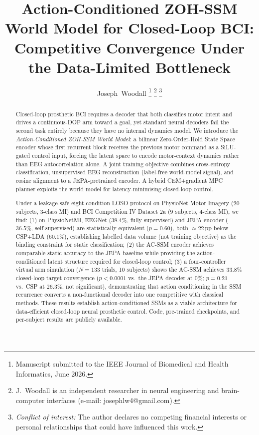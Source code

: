 \documentclass[journal]{IEEEtran}
\begin{document}
\title{Action-Conditioned ZOH-SSM World Model for Closed-Loop BCI: Competitive Convergence Under the Data-Limited Bottleneck}

\author{Joseph~Woodall%
  \thanks{Manuscript submitted to the IEEE Journal of Biomedical and Health
    Informatics, June 2026.}%
  \thanks{J.~Woodall is an independent researcher in neural engineering and
    brain-computer interfaces (e-mail: josephlw4@gmail.com).}%
  \thanks{\emph{Conflict of interest:} The author declares no competing
    financial interests or personal relationships that could have influenced
    this work.}%
}

\maketitle

\begin{abstract}
Closed-loop prosthetic BCI requires a decoder that both classifies motor intent and drives a continuous-DOF arm toward a goal, yet standard neural decoders fail the second task entirely because they have no internal dynamics model.
We introduce the \emph{Action-Conditioned ZOH-SSM World Model}: a bilinear Zero-Order-Hold State Space encoder whose first recurrent block receives the previous motor command as a SiLU-gated control input, forcing the latent space to encode motor-context dynamics rather than EEG autocorrelation alone.
A joint training objective combines cross-entropy classification, unsupervised EEG reconstruction (label-free world-model signal), and cosine alignment to a JEPA-pretrained encoder.
A hybrid CEM+gradient MPC planner exploits the world model for latency-minimising closed-loop control.

Under a leakage-safe eight-condition LOSO protocol on PhysioNet Motor Imagery (20 subjects, 3-class MI) and BCI Competition IV Dataset 2a (9 subjects, 4-class MI), we find:
(1) on PhysioNetMI, EEGNet ($38.4\%$, fully supervised) and JEPA encoder ($36.5\%$, self-supervised) are statistically equivalent ($p=0.60$), both $\approx\!22$\,pp below CSP+LDA ($60.1\%$), establishing labelled data volume (not training objective) as the binding constraint for static classification;
(2) the AC-SSM encoder achieves comparable static accuracy to the JEPA baseline while providing the action-conditioned latent structure required for closed-loop control;
(3) a four-controller virtual arm simulation ($N=133$ trials, 10 subjects) shows the AC-SSM achieves $33.8\%$ closed-loop target convergence ($p{<}0.0001$ vs.\ the JEPA decoder at $0\%$; $p=0.21$ vs.\ CSP at $26.3\%$, not significant), demonstrating that action conditioning in the SSM recurrence converts a non-functional decoder into one competitive with classical methods.
These results establish action-conditioned SSMs as a viable architecture for data-efficient closed-loop neural prosthetic control.
Code, pre-trained checkpoints, and per-subject results are publicly available.
\end{abstract}
\end{document}
